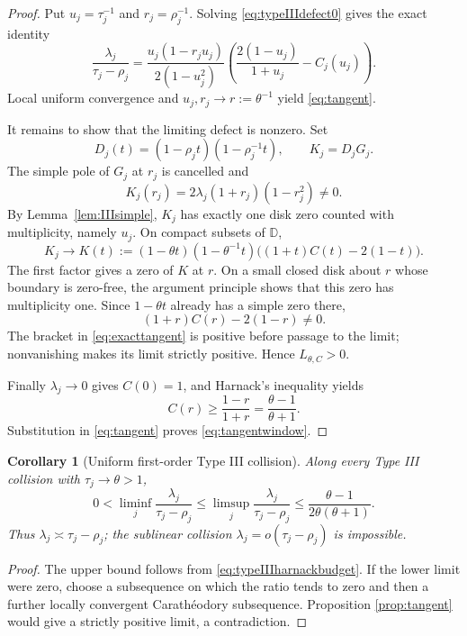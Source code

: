 \documentclass[11pt,reqno]{amsart}
\newtheorem{corollary}[theorem]{Corollary}
\theoremstyle{definition}
\theoremstyle{remark}
\newcommand{\D}{\mathbb D}
\begin{document}
\begin{proof}
Put $u_j=\tau_j^{-1}$ and $r_j=\rho_j^{-1}$.  Solving
\eqref{eq:typeIIIdefect0} gives the exact identity
\begin{equation}\label{eq:exacttangent}
 \frac{\lambda_j}{\tau_j-\rho_j}
 =\frac{u_j(1-r_ju_j)}{2(1-u_j^2)}
 \left(\frac{2(1-u_j)}{1+u_j}-C_j(u_j)\right).
\end{equation}
Local uniform convergence and $u_j,r_j\to r:=\theta^{-1}$ yield
\eqref{eq:tangent}.

It remains to show that the limiting defect is nonzero.  Set
\[
 D_j(t)=(1-\rho_jt)(1-\rho_j^{-1}t),\qquad K_j=D_jG_j.
\]
The simple pole of $G_j$ at $r_j$ is cancelled and
\[
 K_j(r_j)=2\lambda_j(1+r_j)(1-r_j^2)\ne0.
\]
By Lemma~\ref{lem:IIIsimple}, $K_j$ has exactly one disk zero counted with
multiplicity, namely $u_j$.  On compact subsets of $\D$,
\[
 K_j\longrightarrow K(t):=(1-\theta t)(1-\theta^{-1}t)
 \bigl((1+t)C(t)-2(1-t)\bigr).
\]
The first factor gives a zero of $K$ at $r$.  On a small closed disk about
$r$ whose boundary is zero-free, the argument principle shows that this zero
has multiplicity one.  Since $1-\theta t$ already has a simple zero there,
\[
 (1+r)C(r)-2(1-r)\ne0.
\]
The bracket in \eqref{eq:exacttangent} is positive before passage to the
limit; nonvanishing makes its limit strictly positive.  Hence
$L_{\theta,C}>0$.

Finally $\lambda_j\to0$ gives $C(0)=1$, and Harnack's inequality yields
\[
 C(r)\ge\frac{1-r}{1+r}=\frac{\theta-1}{\theta+1}.
\]
Substitution in \eqref{eq:tangent} proves \eqref{eq:tangentwindow}.
\end{proof}

\begin{corollary}[Uniform first-order Type III collision]
\label{cor:IIIlinear}
Along every Type III collision with $\tau_j\to\theta>1$,
\[
 0<\liminf_j\frac{\lambda_j}{\tau_j-\rho_j}
 \le\limsup_j\frac{\lambda_j}{\tau_j-\rho_j}
 \le\frac{\theta-1}{2\theta(\theta+1)}.
\]
Thus $\lambda_j\asymp\tau_j-\rho_j$; the sublinear collision
$\lambda_j=o(\tau_j-\rho_j)$ is impossible.
\end{corollary}

\begin{proof}
The upper bound follows from \eqref{eq:typeIIIharnackbudget}.  If the lower
limit were zero, choose a subsequence on which the ratio tends to zero and
then a further locally convergent Carath\'eodory subsequence.  Proposition
\ref{prop:tangent} would give a strictly positive limit, a contradiction.
\end{proof}
\end{document}
